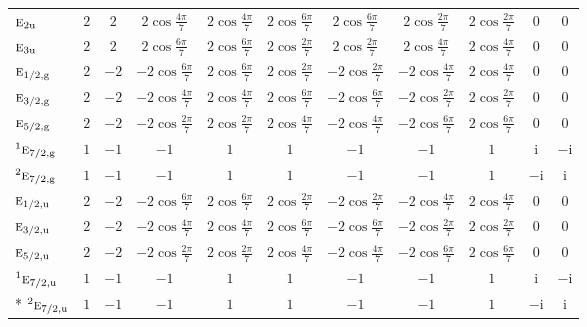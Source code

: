 \documentclass[10pt,a4paper]{article}
\makeatletter
\def\grouprule#1#2{\noalign{\marks\LTgroupmarks{\the\belowrulesep}\nobreak\vskip#1%
  \vskip\aboverulesep}\multispan\LT@cols\unskip{\leaders\hrule\@height#2\hfill\kern\z@}\cr
  \noalign{\penalty\LTrulebreak\vskip\belowrulesep\global\@lastruleclass\z@}}
\numberwithin{equation}{section}
\newcommand{\irr}[1]{\text{\normalfont\scshape #1}}
\newcommand{\conjpair}[1]{{}^{#1}}
\newcommand{\ptag}[1]{\mathrm{#1}}
\newcommand{\iunit}{\mathrm{i}}
\makeatother
\begin{document}
{{\begin{longtable}{@{}lcccccccccc@{}}
$\irr{e}_{2\ptag{u}}$ & $2$ & $2$ & $2\cos\tfrac{4\pi}{7}$ & $2\cos\tfrac{4\pi}{7}$ & $2\cos\tfrac{6\pi}{7}$ & $2\cos\tfrac{6\pi}{7}$ & $2\cos\tfrac{2\pi}{7}$ & $2\cos\tfrac{2\pi}{7}$ & $0$ & $0$\\
$\irr{e}_{3\ptag{u}}$ & $2$ & $2$ & $2\cos\tfrac{6\pi}{7}$ & $2\cos\tfrac{6\pi}{7}$ & $2\cos\tfrac{2\pi}{7}$ & $2\cos\tfrac{2\pi}{7}$ & $2\cos\tfrac{4\pi}{7}$ & $2\cos\tfrac{4\pi}{7}$ & $0$ & $0$\\
\grouprule{0pt}{\lightrulewidth}
$\irr{e}_{1/2,\ptag{g}}$ & $2$ & $-2$ & $-2\cos\tfrac{6\pi}{7}$ & $2\cos\tfrac{6\pi}{7}$ & $2\cos\tfrac{2\pi}{7}$ & $-2\cos\tfrac{2\pi}{7}$ & $-2\cos\tfrac{4\pi}{7}$ & $2\cos\tfrac{4\pi}{7}$ & $0$ & $0$\\
$\irr{e}_{3/2,\ptag{g}}$ & $2$ & $-2$ & $-2\cos\tfrac{4\pi}{7}$ & $2\cos\tfrac{4\pi}{7}$ & $2\cos\tfrac{6\pi}{7}$ & $-2\cos\tfrac{6\pi}{7}$ & $-2\cos\tfrac{2\pi}{7}$ & $2\cos\tfrac{2\pi}{7}$ & $0$ & $0$\\
$\irr{e}_{5/2,\ptag{g}}$ & $2$ & $-2$ & $-2\cos\tfrac{2\pi}{7}$ & $2\cos\tfrac{2\pi}{7}$ & $2\cos\tfrac{4\pi}{7}$ & $-2\cos\tfrac{4\pi}{7}$ & $-2\cos\tfrac{6\pi}{7}$ & $2\cos\tfrac{6\pi}{7}$ & $0$ & $0$\\
$\conjpair{1}\irr{e}_{7/2,\ptag{g}}$ & $1$ & $-1$ & $-1$ & $1$ & $1$ & $-1$ & $-1$ & $1$ & $\iunit{}$ & $-\iunit{}$\\
$\conjpair{2}\irr{e}_{7/2,\ptag{g}}$ & $1$ & $-1$ & $-1$ & $1$ & $1$ & $-1$ & $-1$ & $1$ & $-\iunit{}$ & $\iunit{}$\\
$\irr{e}_{1/2,\ptag{u}}$ & $2$ & $-2$ & $-2\cos\tfrac{6\pi}{7}$ & $2\cos\tfrac{6\pi}{7}$ & $2\cos\tfrac{2\pi}{7}$ & $-2\cos\tfrac{2\pi}{7}$ & $-2\cos\tfrac{4\pi}{7}$ & $2\cos\tfrac{4\pi}{7}$ & $0$ & $0$\\
$\irr{e}_{3/2,\ptag{u}}$ & $2$ & $-2$ & $-2\cos\tfrac{4\pi}{7}$ & $2\cos\tfrac{4\pi}{7}$ & $2\cos\tfrac{6\pi}{7}$ & $-2\cos\tfrac{6\pi}{7}$ & $-2\cos\tfrac{2\pi}{7}$ & $2\cos\tfrac{2\pi}{7}$ & $0$ & $0$\\
$\irr{e}_{5/2,\ptag{u}}$ & $2$ & $-2$ & $-2\cos\tfrac{2\pi}{7}$ & $2\cos\tfrac{2\pi}{7}$ & $2\cos\tfrac{4\pi}{7}$ & $-2\cos\tfrac{4\pi}{7}$ & $-2\cos\tfrac{6\pi}{7}$ & $2\cos\tfrac{6\pi}{7}$ & $0$ & $0$\\
$\conjpair{1}\irr{e}_{7/2,\ptag{u}}$ & $1$ & $-1$ & $-1$ & $1$ & $1$ & $-1$ & $-1$ & $1$ & $\iunit{}$ & $-\iunit{}$\\*
$\conjpair{2}\irr{e}_{7/2,\ptag{u}}$ & $1$ & $-1$ & $-1$ & $1$ & $1$ & $-1$ & $-1$ & $1$ & $-\iunit{}$ & $\iunit{}$\\
\bottomrule\end{longtable}}}
\end{document}

